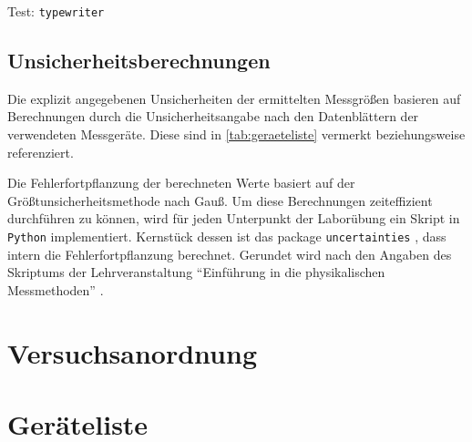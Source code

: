 \documentclass[ngerman]{scrartcl}
\begin{document}
Test: \texttt{typewriter}

\subsection{Unsicherheitsberechnungen}
\label{subsec:unsicherheitsberechnungen}

Die explizit angegebenen Unsicherheiten der ermittelten Messgrößen basieren auf Berechnungen durch die Unsicherheitsangabe nach den Datenblättern der verwendeten Messgeräte. Diese sind in \autoref{tab:geraeteliste} vermerkt beziehungsweise referenziert.

Die Fehlerfortpflanzung der berechneten Werte basiert auf der Größtunsicherheitsmethode nach Gauß. Um diese Berechnungen zeiteffizient durchführen zu können, wird für jeden Unterpunkt der Laborübung ein Skript in \verb!Python! implementiert. Kernstück dessen ist das package \verb!uncertainties! \cite{ref:uncertainties}, dass intern die Fehlerfortpflanzung berechnet. Gerundet wird nach den Angaben des Skriptums der Lehrveranstaltung \enquote{Einführung in die physikalischen Messmethoden} \cite{ref:messmethoden}.



\section{Versuchsanordnung}
\label{sec:versuchsanordnung}



\section{Geräteliste}
\label{sec:geraeteliste}
\end{document}
